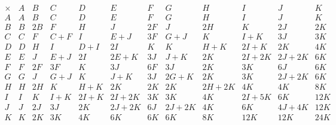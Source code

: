 \documentclass[11pt,oneside]{article}
\newcommand{\thinplus}{\!+\!}
\begin{document}
{\small
$$
\begin{array}{r|rrrrrrrrrrr}
\times & A & B & C & D & E & F & G & H & I & J & K \\
\hline
A & A & B & C & D & E & F & G & H & I & J & K \\
B & B & 2B & F & H & J & 2F & J & 2H & K & 2J & 2K \\
C & C & F & C\thinplus F & I & E\thinplus J & 3F & G\thinplus J & K & I\thinplus K & 3J & 3K \\
D & D & H & I & D\thinplus I & 2I & K & K & H\thinplus K & 2I\thinplus K & 2K & 4K \\
E & E & J & E\thinplus J & 2I & 2E\thinplus K & 3J & J\thinplus K & 2K & 2I\thinplus 2K & 2J\thinplus 2K & 6K \\
F & F & 2F & 3F & K & 3J & 6F & 3J & 2K & 3K & 6J & 6K \\
G & G & J & G\thinplus J & K & J\thinplus K & 3J & 2G\thinplus K & 2K & 3K & 2J\thinplus 2K & 6K \\
H & H & 2H & K & H\thinplus K & 2K & 2K & 2K & 2H\thinplus 2K & 4K & 4K & 8K \\
I & I & K & I\thinplus K & 2I\thinplus K & 2I\thinplus 2K & 3K & 3K & 4K & 2I\thinplus 5K & 6K & 12K \\
J & J & 2J & 3J & 2K & 2J\thinplus 2K & 6J & 2J\thinplus 2K & 4K & 6K & 4J\thinplus 4K & 12K \\
K & K & 2K & 3K & 4K & 6K & 6K & 6K & 8K & 12K & 12K & 24K \\
\end{array}
$$
}
\end{document}

